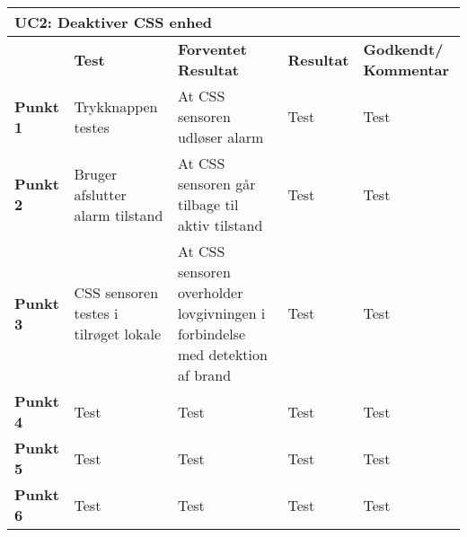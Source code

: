 \begin{table}[htbp] \centering
\begin{tabular}{|p{}|p{}|p{3cm}|p{3cm}|p{3cm}|} %
	\hline
\multicolumn{5}{|l|}{\textbf{UC2: Deaktiver CSS enhed}} \\\hline
&\textbf{Test} &\textbf{Forventet \newline Resultat} &\textbf{Resultat} &\textbf{Godkendt/ \newline Kommentar} \\\hline
\textbf{Punkt 1}		&Trykknappen testes	& At CSS sensoren udløser alarm 	&Test	&Test \\\hline
\textbf{Punkt 2}		&Bruger afslutter alarm tilstand	&At CSS sensoren går tilbage til aktiv tilstand 	&Test	&Test \\\hline
\textbf{Punkt 3}		&CSS sensoren testes i tilrøget lokale	&At CSS sensoren overholder lovgivningen i forbindelse med detektion af brand 	&Test	&Test \\\hline
\textbf{Punkt 4}		&Test	&Test 	&Test	&Test \\\hline
\textbf{Punkt 5}		&Test	&Test 	&Test	&Test \\\hline
\textbf{Punkt 6}		&Test	&Test 	&Test	&Test \\\hline
	\end{tabular}
	\label{ATUC4} 
\end{table}